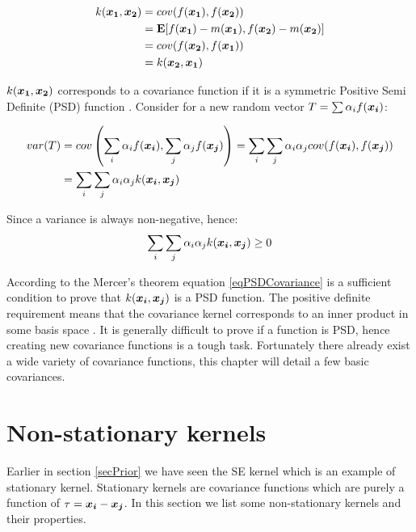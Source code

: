 \begin{align}\label{eqSymmetricCovariance}
    k(\boldsymbol{x_{1}}, \boldsymbol{x_{2}}) & = cov(f(\boldsymbol{x_{1}}), f(\boldsymbol{x_{2}})) \\ 
                                & = \mathbf{E}[f(\boldsymbol{x_1}) - m(\boldsymbol{x_1}), f(\boldsymbol{x_2}) - m(\boldsymbol{x_2})] \\
                                & = cov(f(\boldsymbol{x_{2}}), f(\boldsymbol{x_{1}})) \\ 
                                & =  k(\boldsymbol{x_{2}}, \boldsymbol{x_{1}})
\end{align}

$k(\boldsymbol{x_{1}}, \boldsymbol{x_{2}})$ corresponds to a covariance function if it is a symmetric Positive Semi Definite (PSD) function \cite{mercer1909functions, loeve1978probability, durrande2001etude}. Consider for a new random vector $T = \sum \alpha_{i}f(\boldsymbol{x_{i}})$:

\begin{equation}\label{eqDerivePSDCovariance}
    \begin{aligned}
        var(T) & = cov\left ( \sum_{i} \alpha_{i}f(\boldsymbol{x_{i}}), \sum_{j} \alpha_{j}f(\boldsymbol{x_{j}}) \right ) = \sum_{i}\sum_{j}\alpha_{i}\alpha_{j}cov(f(\boldsymbol{x_{i}}), f(\boldsymbol{x_{j}})) \\
& = \sum_{i}\sum_{j}\alpha_{i}\alpha_{j}k(\boldsymbol{x_{i}}, \boldsymbol{x_{j}})
    \end{aligned}
\end{equation}

Since a variance is always non-negative, hence:
\begin{equation}\label{eqPSDCovariance}
\sum_{i}\sum_{j}\alpha_{i}\alpha_{j}k(\boldsymbol{x_{i}}, \boldsymbol{x_{j}}) \geq 0
\end{equation}

According to the Mercer's theorem  \cite{mercer1909functions} equation \ref{eqPSDCovariance} is a sufficient condition to prove that $k(\boldsymbol{x_{i}}, \boldsymbol{x_{j}})$ is a PSD function. The positive definite requirement means that the covariance kernel corresponds to an inner product in some basis space \cite{bishop2006pattern}. It is generally difficult to prove if a function is PSD, hence creating new covariance functions is a tough task. Fortunately there already exist a wide variety of covariance functions, this chapter will detail a few basic covariances. 

\section{Non-stationary kernels}\label{secNonStationaryKernels}
Earlier in section \ref{secPrior} we have seen the SE kernel which is an example of stationary kernel. Stationary kernels are covariance functions which are purely a function of $\tau = \boldsymbol{x_{i}} - \boldsymbol{x_{j}}$. In this section we list some non-stationary kernels and their properties. 

